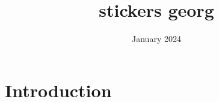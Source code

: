 \documentclass{article}
\title{stickers georg}
\author{}
\date{January 2024}
\begin{document}
\maketitle

\section{Introduction}
\end{document}
